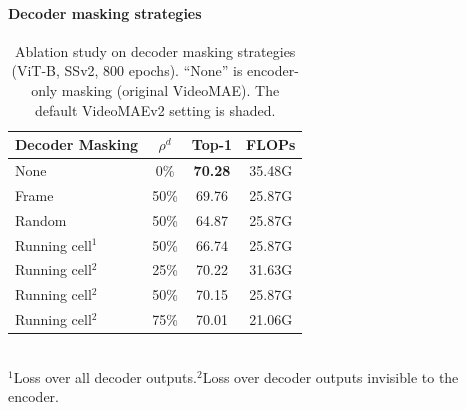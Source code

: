 \begin{enrichment}
\begin{enrichment}
            \paragraph{Decoder masking strategies}
            \begin{table}[H]
                \centering
                \small
                \setlength{\tabcolsep}{6pt}
                \caption{Ablation study on decoder masking strategies (ViT-B, SSv2, $800$ epochs). ``None'' is encoder-only masking (original VideoMAE). The default VideoMAEv2 setting is shaded.}
                \label{tab:videomaev2_ablation_decoder}
                \begin{tabular}{lccc}
                    \toprule
                    \textbf{Decoder Masking} & $\rho^{d}$ & \textbf{Top-1} & \textbf{FLOPs} \\
                    \midrule
                    None            & 0\%  & \textbf{70.28} & 35.48G \\
                    Frame           & 50\% & 69.76 & 25.87G \\
                    Random          & 50\% & 64.87 & 25.87G \\
                    Running cell$^{1}$ & 50\% & 66.74 & 25.87G \\
                    Running cell$^{2}$ & 25\% & 70.22 & 31.63G \\
                    Running cell$^{2}$ & 50\% & 70.15 & 25.87G \\
                    Running cell$^{2}$ & 75\% & 70.01 & 21.06G \\
                    \bottomrule
                \end{tabular}\\[2pt]
                {\footnotesize $^{1}$Loss over all decoder outputs.\quad $^{2}$Loss over decoder outputs invisible to the encoder.}
            \end{table}
            

\end{enrichment}
\end{enrichment}
